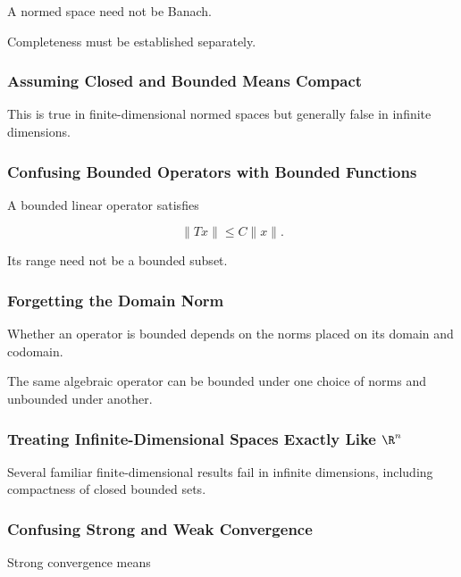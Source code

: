 A normed space need not be Banach.

Completeness must be established separately.

\subsubsection{Assuming Closed and Bounded Means Compact}

This is true in finite-dimensional normed spaces but generally false in
infinite dimensions.

\subsubsection{Confusing Bounded Operators with Bounded Functions}

A bounded linear operator satisfies

\[
\|Tx\|
\leq
C\|x\|.
\]

Its range need not be a bounded subset.

\subsubsection{Forgetting the Domain Norm}

Whether an operator is bounded depends on the norms placed on its domain
and codomain.

The same algebraic operator can be bounded under one choice of norms and
unbounded under another.

\subsubsection{Treating Infinite-Dimensional Spaces Exactly Like \(\R^n\)}

Several familiar finite-dimensional results fail in infinite dimensions,
including compactness of closed bounded sets.

\subsubsection{Confusing Strong and Weak Convergence}

Strong convergence means

